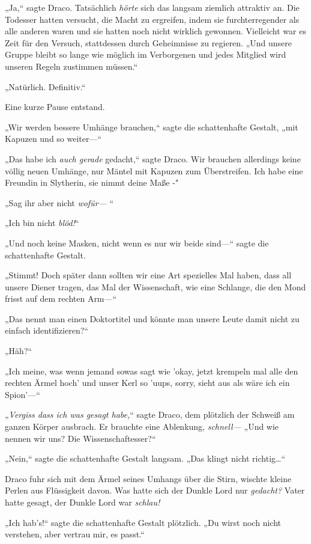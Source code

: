 {„Ja,“ sagte Draco. Tatsächlich \emph{hörte} sich das langsam ziemlich attraktiv an. Die Todesser hatten versucht, die Macht zu ergreifen, indem sie furchterregender als alle anderen waren und sie hatten noch nicht wirklich gewonnen. Vielleicht war es Zeit für den Versuch, stattdessen durch Geheimnisse zu regieren. „Und unsere Gruppe bleibt so lange wie möglich im Verborgenen und jedes Mitglied wird unseren Regeln zustimmen müssen.“

„Natürlich. Definitiv.“

Eine kurze Pause entstand.

„Wir werden bessere Umhänge brauchen,“ sagte die schattenhafte Gestalt, „mit Kapuzen und so weiter—“

„Das habe ich \emph{auch gerade} gedacht,“ sagte Draco. Wir brauchen allerdings keine völlig neuen Umhänge, nur Mäntel mit Kapuzen zum Überstreifen. Ich habe eine Freundin in Slytherin, sie nimmt deine Maße -"

„Sag ihr aber nicht \emph{wofür—} “

„Ich bin nicht \emph{blöd!}“

„Und noch keine Masken, nicht wenn es nur wir beide sind—“ sagte die schattenhafte Gestalt.

„Stimmt! Doch später dann sollten wir eine Art spezielles Mal haben, dass all unsere Diener tragen, das Mal der Wissenschaft, wie eine Schlange, die den Mond frisst auf dem rechten Arm—“

„Das nennt man einen Doktortitel und könnte man unsere Leute damit nicht zu einfach identifizieren?“

„Häh?“

„Ich meine, was wenn jemand sowas sagt wie 'okay, jetzt krempeln mal alle den rechten Ärmel hoch' und unser Kerl so 'uups, sorry, sieht aus als wäre ich ein Spion'—“

„\emph{Vergiss dass ich was gesagt habe,}“ sagte Draco, dem plötzlich der Schweiß am ganzen Körper ausbrach. Er brauchte eine Ablenkung, \emph{schnell—} „Und wie nennen wir uns? Die Wissenschaftesser?“

„Nein,“ sagte die schattenhafte Gestalt langsam. „Das klingt nicht richtig…“

Draco fuhr sich mit dem Ärmel seines Umhangs über die Stirn, wischte kleine Perlen aus Flüssigkeit davon. Was hatte sich der Dunkle Lord nur \emph{gedacht?} Vater hatte gesagt, der Dunkle Lord war \emph{schlau!}

„Ich hab's!“ sagte die schattenhafte Gestalt plötzlich. „Du wirst noch nicht verstehen, aber vertrau mir, es passt.“

}
